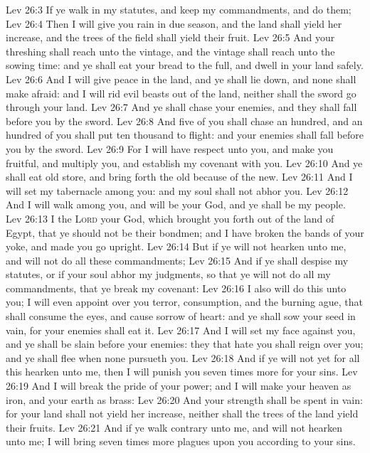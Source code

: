\vs Lev 26:3 If ye walk in my statutes, and keep my commandments, and do them;
\vs Lev 26:4 Then I will give you rain in due season, and the land shall yield her increase, and the trees of the field shall yield their fruit.
\vs Lev 26:5 And your threshing shall reach unto the vintage, and the vintage shall reach unto the sowing time: and ye shall eat your bread to the full, and dwell in your land safely.
\vs Lev 26:6 And I will give peace in the land, and ye shall lie down, and none shall make  afraid: and I will rid evil beasts out of the land, neither shall the sword go through your land.
\vs Lev 26:7 And ye shall chase your enemies, and they shall fall before you by the sword.
\vs Lev 26:8 And five of you shall chase an hundred, and an hundred of you shall put ten thousand to flight: and your enemies shall fall before you by the sword.
\vs Lev 26:9 For I will have respect unto you, and make you fruitful, and multiply you, and establish my covenant with you.
\vs Lev 26:10 And ye shall eat old store, and bring forth the old because of the new.
\vs Lev 26:11 And I will set my tabernacle among you: and my soul shall not abhor you.
\vs Lev 26:12 And I will walk among you, and will be your God, and ye shall be my people.
\vs Lev 26:13 I  the \textsc{Lord} your God, which brought you forth out of the land of Egypt, that ye should not be their bondmen; and I have broken the bands of your yoke, and made you go upright.
\vs Lev 26:14 But if ye will not hearken unto me, and will not do all these commandments;
\vs Lev 26:15 And if ye shall despise my statutes, or if your soul abhor my judgments, so that ye will not do all my commandments,  that ye break my covenant:
\vs Lev 26:16 I also will do this unto you; I will even appoint over you terror, consumption, and the burning ague, that shall consume the eyes, and cause sorrow of heart: and ye shall sow your seed in vain, for your enemies shall eat it.
\vs Lev 26:17 And I will set my face against you, and ye shall be slain before your enemies: they that hate you shall reign over you; and ye shall flee when none pursueth you.
\vs Lev 26:18 And if ye will not yet for all this hearken unto me, then I will punish you seven times more for your sins.
\vs Lev 26:19 And I will break the pride of your power; and I will make your heaven as iron, and your earth as brass:
\vs Lev 26:20 And your strength shall be spent in vain: for your land shall not yield her increase, neither shall the trees of the land yield their fruits.
\vs Lev 26:21 And if ye walk contrary unto me, and will not hearken unto me; I will bring seven times more plagues upon you according to your sins.
